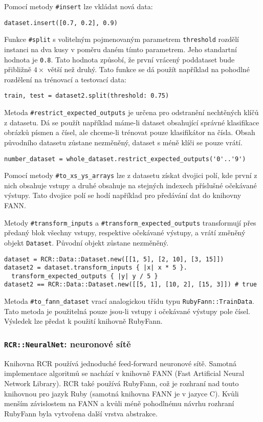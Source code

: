 \documentclass[a4paper]{article}
\begin{document}
Pomocí metody \texttt{\#insert} lze vkládat nová data:
\begin{lstlisting}
dataset.insert([0.7, 0.2], 0.9)
\end{lstlisting}

Funkce \texttt{\#split} s volitelným pojmenovaným parametrem \texttt{threshold}
rozdělí instanci na dva kusy v poměru daném tímto parametrem. Jeho standartní
hodnota je \texttt{0.8}. Tato hodnota způsobí, že první vrácený poddataset bude
přibližně $4\times$ větší než druhý.
Tato funkce se dá použít například na pohodlné rozdělení na trénovací a
testovací data:
\begin{lstlisting}
train, test = dataset2.split(threshold: 0.75)
\end{lstlisting}

Metoda \texttt{\#restrict\_expected\_outputs} je určena pro odstranění nechtěných klíčů
z datasetu. Dá se použít například máme-li dataset obsahující správné klasifikace
obrázků písmen a čísel, ale chceme-li trénovat pouze klasifikátor na čísla.
Obsah původního datasetu zůstane nezměněný, dataset s méně klíči se pouze vrátí.
\begin{lstlisting}
number_dataset = whole_dataset.restrict_expected_outputs('0'..'9')
\end{lstlisting}

Pomocí metody \texttt{\#to\_xs\_ys\_arrays} lze z datasetu získat dvojici polí,
kde první z nich obsahuje vstupy a druhé obsahuje na stejných indexech příslušné
očekávané výstupy. Tato dvojice polí se hodí například pro předávání dat do
knihovny FANN.

Metody \texttt{\#transform\_inputs} a \texttt{\#transform\_expected\_outputs} transformují
přes předaný blok všechny vstupy, respektive očekávané výstupy, a vrátí změněný
objekt \texttt{Dataset}. Původní objekt zůstane nezměněný.
\begin{lstlisting}
dataset = RCR::Data::Dataset.new([[1, 5], [2, 10], [3, 15]])
dataset2 = dataset.transform_inputs { |x| x * 5 }.
  transform_expected_outputs { |y| y / 5 }
dataset2 == RCR::Data::Dataset.new([[5, 1], [10, 2], [15, 3]]) # true
\end{lstlisting}

Metoda \texttt{\#to\_fann\_dataset} vrací analogickou třídu typu
\texttt{RubyFann::TrainData}. Tato metoda je použitelná pouze jsou-li vstupy i
očekávané výstupy pole čísel. Výsledek lze předat k použití knihovně RubyFann.

\subsubsection{\texttt{RCR::NeuralNet}: neuronové sítě}
Knihovna RCR používá jednoduché feed-forward neuronové sítě. Samotná
implementace algoritmů se nachází v knihovně FANN (Fast Artificial Neural %
Network Library). RCR také používá RubyFann, což je rozhraní nad touto knihovnou
pro jazyk Ruby (samotná knihovna FANN je v jazyce C). Kvůli menším závislostem
na FANN a kvůli méně pohodlnému návrhu rozhraní RubyFann byla vytvořena další
vrstva abstrakce.
\end{document}
